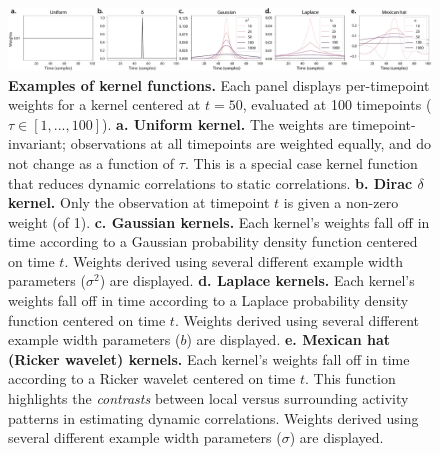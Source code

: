 \documentclass[english]{article}
\begin{document}
\begin{figure}
  \centering
  \includegraphics[width=\textwidth]{figs/kernels}
  \caption{\textbf{Examples of kernel functions.} Each panel displays
    per-timepoint weights for a kernel centered at $t = 50$, evaluated
    at 100 timepoints ($\tau \in \left[1, ..., 100\right]$).
    \textbf{a. Uniform kernel.} The weights are timepoint-invariant;
    observations at all timepoints are weighted equally, and do not
    change as a function of $\tau$.  This is a special case kernel
    function that reduces dynamic correlations to static correlations.
    \textbf{b. Dirac $\delta$ kernel.} Only the observation at
    timepoint $t$ is given a non-zero weight (of 1).
    \textbf{c. Gaussian kernels.} Each kernel's weights fall off in
    time according to a Gaussian probability density function centered
    on time $t$.  Weights derived using several different example
    width parameters ($\sigma^2$) are displayed.  \textbf{d. Laplace
      kernels.}  Each kernel's weights fall off in time according to a
    Laplace probability density function centered on time $t$.
    Weights derived using several different example width parameters
    ($b$) are displayed.  \textbf{e. Mexican hat (Ricker wavelet)
      kernels.}  Each kernel's weights fall off in time according to a
    Ricker wavelet centered on time $t$.  This function highlights the
    \textit{contrasts} between local versus surrounding activity
    patterns in estimating dynamic correlations. Weights derived using
    several different example width parameters ($\sigma$) are
    displayed.}
  \label{fig:kernels}
\end{figure}
\end{document}
